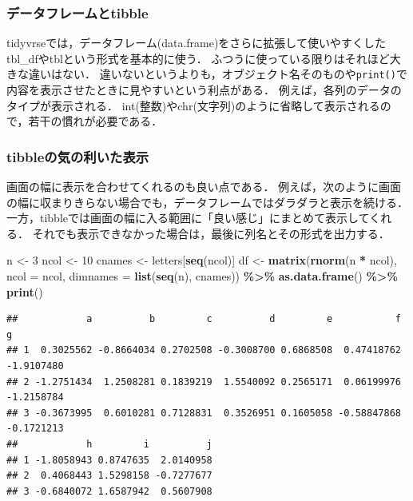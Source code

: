 \documentclass[
]{article}
\newenvironment{Shaded}{\begin{snugshade}}{\end{snugshade}}
\newcommand{\AttributeTok}[1]{\textcolor[rgb]{0.13,0.29,0.53}{#1}}
\newcommand{\DecValTok}[1]{\textcolor[rgb]{0.00,0.00,0.81}{#1}}
\newcommand{\FunctionTok}[1]{\textcolor[rgb]{0.13,0.29,0.53}{\textbf{#1}}}
\newcommand{\NormalTok}[1]{#1}
\newcommand{\OtherTok}[1]{\textcolor[rgb]{0.56,0.35,0.01}{#1}}
\newcommand{\SpecialCharTok}[1]{\textcolor[rgb]{0.81,0.36,0.00}{\textbf{#1}}}
\begin{document}
\hypertarget{ux30c7ux30fcux30bfux30d5ux30ecux30fcux30e0ux3068tibble}{%
\subsubsection{データフレームとtibble}\label{ux30c7ux30fcux30bfux30d5ux30ecux30fcux30e0ux3068tibble}}

tidyvrseでは，データフレーム(data.frame)をさらに拡張して使いやすくした tbl\_dfやtblという形式を基本的に使う．
ふつうに使っている限りはそれほど大きな違いはない．
違いないというよりも，オブジェクト名そのものや\texttt{print()}で内容を表示させたときに見やすいという利点がある．
例えば，各列のデータのタイプが表示される．
int(整数)やchr(文字列)のように省略して表示されるので，若干の慣れが必要である．

\hypertarget{tibbleux306eux6c17ux306eux5229ux3044ux305fux8868ux793a}{%
\subsubsection{tibbleの気の利いた表示}\label{tibbleux306eux6c17ux306eux5229ux3044ux305fux8868ux793a}}

画面の幅に表示を合わせてくれるのも良い点である．
例えば，次のように画面の幅に収まりきらない場合でも，データフレームではダラダラと表示を続ける．
一方，tibbleでは画面の幅に入る範囲に「良い感じ」にまとめて表示してくれる．
それでも表示できなかった場合は，最後に列名とその形式を出力する．

\begin{Shaded}
\begin{Highlighting}[]
\NormalTok{n }\OtherTok{\textless{}{-}} \DecValTok{3}
\NormalTok{ncol }\OtherTok{\textless{}{-}} \DecValTok{10}
\NormalTok{cnames }\OtherTok{\textless{}{-}}\NormalTok{ letters[}\FunctionTok{seq}\NormalTok{(ncol)]}
\NormalTok{df }\OtherTok{\textless{}{-}} 
  \FunctionTok{matrix}\NormalTok{(}\FunctionTok{rnorm}\NormalTok{(n }\SpecialCharTok{*}\NormalTok{ ncol), }\AttributeTok{ncol =}\NormalTok{ ncol, }\AttributeTok{dimnames =} \FunctionTok{list}\NormalTok{(}\FunctionTok{seq}\NormalTok{(n), cnames)) }\SpecialCharTok{\%\textgreater{}\%}
  \FunctionTok{as.data.frame}\NormalTok{() }\SpecialCharTok{\%\textgreater{}\%}
  \FunctionTok{print}\NormalTok{()}
\end{Highlighting}
\end{Shaded}

\begin{verbatim}
##            a          b         c          d         e           f          g
## 1  0.3025562 -0.8664034 0.2702508 -0.3008700 0.6868508  0.47418762 -1.9107480
## 2 -1.2751434  1.2508281 0.1839219  1.5540092 0.2565171  0.06199976 -1.2158784
## 3 -0.3673995  0.6010281 0.7128831  0.3526951 0.1605058 -0.58847868 -0.1721213
##            h         i          j
## 1 -1.8058943 0.8747635  2.0140958
## 2  0.4068443 1.5298158 -0.7277677
## 3 -0.6840072 1.6587942  0.5607908
\end{verbatim}
\end{document}
